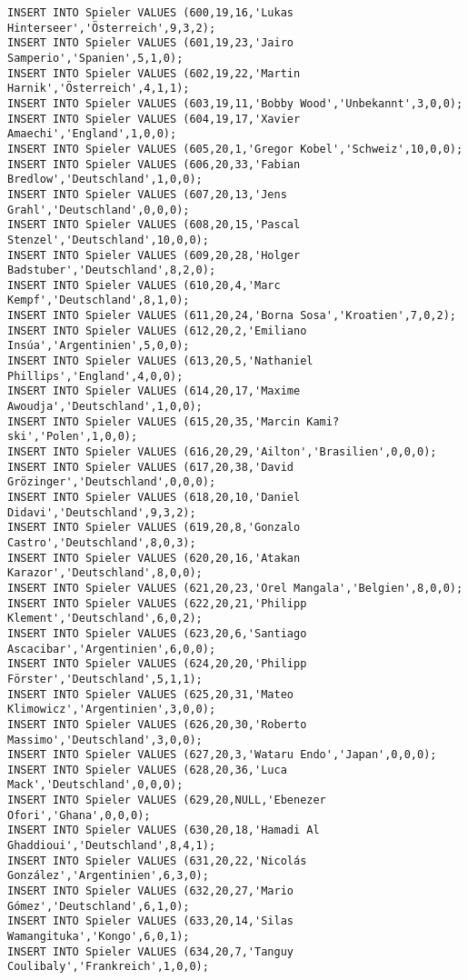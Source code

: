 \documentclass{bschlangaul-aufgabe}
\begin{document}
\begin{verbatim}
INSERT INTO Spieler VALUES (600,19,16,'Lukas Hinterseer','Österreich',9,3,2);
INSERT INTO Spieler VALUES (601,19,23,'Jairo Samperio','Spanien',5,1,0);
INSERT INTO Spieler VALUES (602,19,22,'Martin Harnik','Österreich',4,1,1);
INSERT INTO Spieler VALUES (603,19,11,'Bobby Wood','Unbekannt',3,0,0);
INSERT INTO Spieler VALUES (604,19,17,'Xavier Amaechi','England',1,0,0);
INSERT INTO Spieler VALUES (605,20,1,'Gregor Kobel','Schweiz',10,0,0);
INSERT INTO Spieler VALUES (606,20,33,'Fabian Bredlow','Deutschland',1,0,0);
INSERT INTO Spieler VALUES (607,20,13,'Jens Grahl','Deutschland',0,0,0);
INSERT INTO Spieler VALUES (608,20,15,'Pascal Stenzel','Deutschland',10,0,0);
INSERT INTO Spieler VALUES (609,20,28,'Holger Badstuber','Deutschland',8,2,0);
INSERT INTO Spieler VALUES (610,20,4,'Marc Kempf','Deutschland',8,1,0);
INSERT INTO Spieler VALUES (611,20,24,'Borna Sosa','Kroatien',7,0,2);
INSERT INTO Spieler VALUES (612,20,2,'Emiliano Insúa','Argentinien',5,0,0);
INSERT INTO Spieler VALUES (613,20,5,'Nathaniel Phillips','England',4,0,0);
INSERT INTO Spieler VALUES (614,20,17,'Maxime Awoudja','Deutschland',1,0,0);
INSERT INTO Spieler VALUES (615,20,35,'Marcin Kami?ski','Polen',1,0,0);
INSERT INTO Spieler VALUES (616,20,29,'Ailton','Brasilien',0,0,0);
INSERT INTO Spieler VALUES (617,20,38,'David Grözinger','Deutschland',0,0,0);
INSERT INTO Spieler VALUES (618,20,10,'Daniel Didavi','Deutschland',9,3,2);
INSERT INTO Spieler VALUES (619,20,8,'Gonzalo Castro','Deutschland',8,0,3);
INSERT INTO Spieler VALUES (620,20,16,'Atakan Karazor','Deutschland',8,0,0);
INSERT INTO Spieler VALUES (621,20,23,'Orel Mangala','Belgien',8,0,0);
INSERT INTO Spieler VALUES (622,20,21,'Philipp Klement','Deutschland',6,0,2);
INSERT INTO Spieler VALUES (623,20,6,'Santiago Ascacibar','Argentinien',6,0,0);
INSERT INTO Spieler VALUES (624,20,20,'Philipp Förster','Deutschland',5,1,1);
INSERT INTO Spieler VALUES (625,20,31,'Mateo Klimowicz','Argentinien',3,0,0);
INSERT INTO Spieler VALUES (626,20,30,'Roberto Massimo','Deutschland',3,0,0);
INSERT INTO Spieler VALUES (627,20,3,'Wataru Endo','Japan',0,0,0);
INSERT INTO Spieler VALUES (628,20,36,'Luca Mack','Deutschland',0,0,0);
INSERT INTO Spieler VALUES (629,20,NULL,'Ebenezer Ofori','Ghana',0,0,0);
INSERT INTO Spieler VALUES (630,20,18,'Hamadi Al Ghaddioui','Deutschland',8,4,1);
INSERT INTO Spieler VALUES (631,20,22,'Nicolás González','Argentinien',6,3,0);
INSERT INTO Spieler VALUES (632,20,27,'Mario Gómez','Deutschland',6,1,0);
INSERT INTO Spieler VALUES (633,20,14,'Silas Wamangituka','Kongo',6,0,1);
INSERT INTO Spieler VALUES (634,20,7,'Tanguy Coulibaly','Frankreich',1,0,0);

\end{verbatim}
\end{document}
